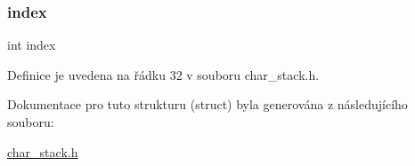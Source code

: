 \mbox{\label{struct_s___char_stack_a750b5d744c39a06bfb13e6eb010e35d0}} 
\subsubsection{\texorpdfstring{index}{index}}
{\footnotesize\ttfamily int index}



Definice je uvedena na řádku 32 v souboru char\+\_\+stack.\+h.



Dokumentace pro tuto strukturu (struct) byla generována z následujícího souboru\+:\begin{DoxyCompactItemize}
\item 
\hyperlink{char__stack_8h}{char\+\_\+stack.\+h}\end{DoxyCompactItemize}
